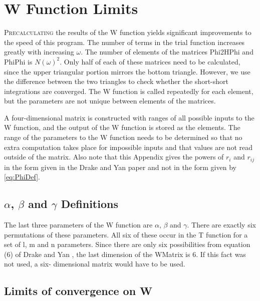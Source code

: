 \documentclass[Dissertation.tex]{subfiles}
\begin{document}
\chapter{W Function Limits}
\label{chp:WLimits}

\lettrine{\textcolor{startcolor}{P}}{recalculating} the results of the W 
function yields significant improvements to the speed of this program.  The 
number of terms in the trial function increases greatly with increasing
$\omega$. The number of elements of the matrices Phi2HPhi and PhiPhi is
$N(\omega)^2$. Only half of each of these matrices need to be calculated, 
since the upper triangular portion mirrors the bottom triangle. However, we 
use the difference between the two triangles to check whether the short-short 
integrations are converged. The W function is called repeatedly for each 
element, but the parameters are not unique between elements of the matrices.

A four-dimensional matrix is constructed with ranges of all possible inputs 
to the W function, and the output of the W function is stored as the 
elements.  The range of the parameters to the W function needs to be 
determined so that no extra computation takes place for impossible inputs and 
that values are not read outside of the matrix. Also note that this Appendix
gives the powers of $r_i$ and $r_{ij}$ in the form given in the Drake and
Yan \cite{Drake1995} paper and not in the form given by \cref{eq:PhiDef}.

\section{\texorpdfstring{$\alpha$, $\beta$ and $\gamma$} {alpha, beta and gamma} Definitions}

The last three parameters of the W function are $\alpha$, $\beta$ and $\gamma$.
There are exactly six permutations of these parameters. All six of these 
occur in the T function for a set of l, m and n parameters. Since there are 
only six possibilities from equation (6) of Drake and Yan \cite{Drake1995}, 
the last dimension of the WMatrix is 6. If this fact was not used, a six-
dimensional matrix would have to be used.

\section{Limits of convergence on W}
\end{document}
